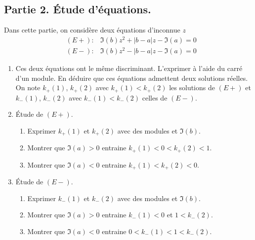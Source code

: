 \subsection*{Partie 2. \'Etude d'équations.}
Dans cette partie, on considère deux équations d'inconnue $z$
\begin{align*}
  &(E+):  &\Im(b) z^2 + |b-a| z -\Im(a) = 0\\
  &(E-):  &\Im(b) z^2 - |b-a| z -\Im(a) = 0
\end{align*}
\begin{enumerate}
  \item Ces deux équations ont le même discriminant. L'exprimer à l'aide du carré d'un module. En déduire que ces équations admettent deux solutions réelles.\newline
  On note $k_+(1)$, $k_+(2)$ avec $k_+(1) < k_+(2)$ les solutions de $(E+)$ et $k_-(1)$, $k_-(2)$ avec $k_-(1) < k_-(2)$ celles de $(E-)$.

  \item \'Etude de $(E+)$.
  \begin{enumerate}
\item Exprimer $k_+(1)$ et $k_+(2)$ avec des modules et $\Im(b)$.
\item Montrer que $\Im(a)>0$ entraine $k_+(1)< 0 < k_+(2) < 1$.
\item Montrer que $\Im(a)<0$ entraine $k_+(1) < k_+(2) < 0$.
  \end{enumerate}

  \item \'Etude de $(E-)$.
  \begin{enumerate}
\item Exprimer $k_-(1)$ et $k_-(2)$ avec des modules et $\Im(b)$.
\item Montrer que $\Im(a)>0$ entraine $k_-(1)< 0$ et $1 < k_-(2)$.
\item Montrer que $\Im(a)<0$ entraine $0 < k_-(1)< 1 < k_-(2) $.
  \end{enumerate}
\end{enumerate}


